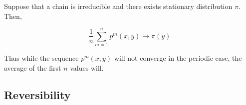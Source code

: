 	\begin{theorem}
		\label{thm:convergence-to-the-stationary-distribution}
		Suppose that a chain is irreducible and there exists stationary distribution $\pi$. Then, 

			\begin{equation}
				\frac{1}{n} \sum_{m=1}^n p^m (x, y) \rightarrow \pi(y)
			\end{equation}

		Thus while the sequence $p^m (x, y)$ will not converge in the periodic case, the average of the first $n$ values will. 
	\end{theorem}

\subsection{Reversibility}

